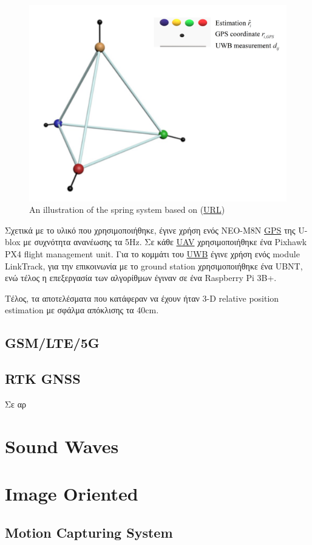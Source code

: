 \begin{figure} [H]
	\centering
	\includegraphics[width=0.5\linewidth]{Images/Related-Work/paper-spring.png}
	\decoRule
	\caption[An illustration of the spring system]{An illustration of the spring system based on \cite{uwb-imu-gps1} (\href{https://www.researchgate.net/publication/345459052_Cooperative_3-D_relative_localization_for_UAV_swarm_by_fusing_UWB_with_IMU_and_GPS}{URL})}
	\label{fig:spring-system}
\end{figure}

Σχετικά με το υλικό που χρησιμοποιήθηκε, έγινε χρήση ενός NEO-M8N \hyperref[abbr:GPS]{GPS} της U-blox με συχνότητα ανανέωσης τα 5Hz.  
Σε κάθε \hyperref[abbr:UAV]{UAV} χρησιμοποιήθηκε ένα Pixhawk PX4 flight management unit. Για το κομμάτι του \hyperref[abbr:UWB]{UWB} έγινε χρήση
ενός module LinkTrack, για την επικοινωνία με το ground station χρησιμοποιήθηκε ένα UBNT, ενώ τέλος η επεξεργασία των αλγορίθμων έγιναν 
σε ένα Raspberry Pi 3B+. 

Τέλος, τα αποτελέσματα που κατάφεραν να έχουν ήταν 3-D relative position estimation με σφάλμα απόκλισης τα 40cm. 

\subsection{GSM/LTE/5G}



\subsection{RTK GNSS}
Σε αρ

\section{Sound Waves}

\cite{sound-waves-for-drone-localization}

\section{Image Oriented}

\subsection{Motion Capturing System}




